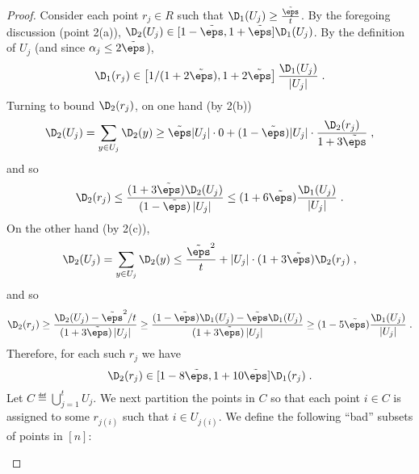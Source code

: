 \begin{proof}
Consider each point $r_j \in R$ such that
\mbox{$\D_1( U_j) \geq \frac{\tilde{\eps}}{t}$}.
By the foregoing discussion (point 2(a)), \mbox{$\D_2( U_j) \in [1-\tilde{\eps},1+\tilde{\eps}]\D_1( U_j)$}.
By the definition of  $U_j$ (and since
$\alpha_j \leq 2\tilde{\eps}$),
\begin{equation}
\D_1(r_j) \in \left[1/(1+2\tilde{\eps}),1+2\tilde{\eps}\right]
     \frac{\D_1(U_j )}
     {\left|U_j\right|}\;.
\end{equation}
Turning to bound $\D_2(r_j)$, on one hand (by 2(b))
\begin{equation}
\D_2(U_j) = \sum_{y\in U_j} \D_2(y) \geq \tilde{\eps}|U_j|\cdot 0
  + (1-\tilde{\eps})|U_j|\cdot \frac{\D_2(r_j)}{1+3\tilde{\eps}}\;,
\end{equation}
and so
\begin{equation}
\D_2(r_j) \leq
    \frac{(1+3\tilde{\eps})\D_2( U_j )}
     {(1-\tilde{\eps})\left|U_j\right|}
     \leq (1+6\tilde{\eps})\frac{\D_1( U_j )}
     {\left|U_j\right|}\;.
\end{equation}
On the other hand (by 2(c)),
\begin{equation}
\D_2(U_j) = \sum_{y\in U_j} \D_2(y) \leq \frac{\tilde{\eps}^2}{t}
  + |U_j|\cdot (1+3\tilde{\eps}) \D_2(r_j)\;,
\end{equation}
and so
\begin{equation}
\D_2(r_j) \geq
    \frac{\D_2( U_j) -\tilde{\eps}^2/t}
     {(1+3\tilde{\eps})\left|U_j\right|}
   \geq
    \frac{(1-\tilde{\eps})\D_1( U_j)
           -\tilde{\eps}\D_1(U_j)}
     {(1+3\tilde{\eps})\left|U_j\right|}
     \geq (1-5\tilde{\eps})\frac{\D_1( U_j )}
     {\left|U_j\right|}\;.
\end{equation}
Therefore, for each such $r_j$ we have
\begin{equation}\label{eq:D2-rj-D1-rj}
\D_2(r_j) \in [1-8\tilde{\eps},1+10\tilde{\eps}]\D_1(r_j)\;.
\end{equation}
Let $C \eqdef \bigcup_{j=1}^t U_j$.
We next partition the points in $C$ so that each
point $i \in C$ is assigned to some $r_{j(i)}$
such that $i \in U_{j(i)}$. We define the following
``bad'' subsets of points in $[n]$:
\begin{enumerate}
  

\end{enumerate}
\end{proof}
